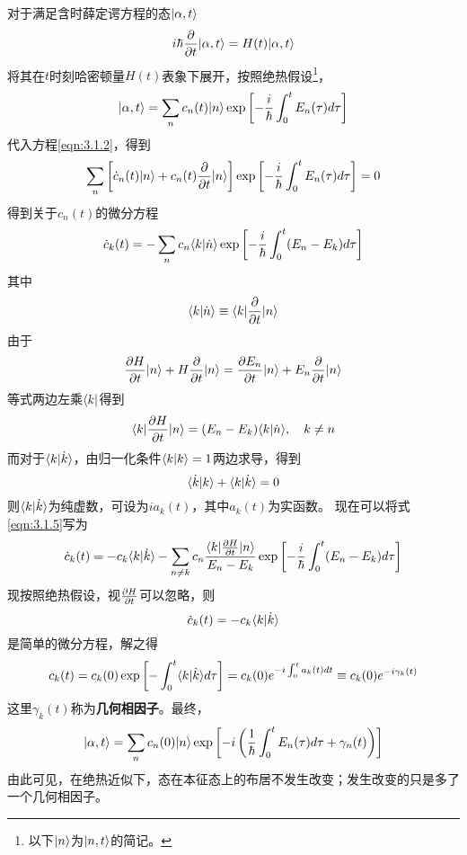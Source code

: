 对于满足含时薛定谔方程的态$ |\alpha,t\rangle $
\begin{equation}\label{eqn:3.1.2}
i\hbar\frac{\partial}{\partial t}|\alpha,t\rangle=H(t)|\alpha,t\rangle
\end{equation}
将其在$ t $时刻哈密顿量$ H(t) $表象下展开，按照绝热假设\footnote{以下$ |n\rangle $为$ |n,t\rangle $的简记。}，
\begin{equation}\label{key}
|\alpha,t\rangle=\sum_nc_n(t)|n\rangle\exp\left[-\frac{i}{\hbar}\int_0^tE_n(\tau)d\tau\right]
\end{equation}
代入方程\eqref{eqn:3.1.2}，得到
\begin{equation}\label{key}
\sum_n\left[\dot{c}_n(t)|n\rangle+c_n(t)\dfrac{\partial}{\partial t}|n\rangle\right]\exp\left[-\frac{i}{\hbar}\int_0^tE_n(\tau)d\tau\right]=0
\end{equation}
得到关于$ c_n(t) $的微分方程
\begin{equation}\label{eqn:3.1.5}
\dot{c}_k(t)=-\sum_nc_n\langle k|\dot{n}\rangle\exp\left[-\dfrac{i}{\hbar}\int_0^t(E_n-E_k)d\tau\right]
\end{equation}
其中
\begin{equation}\label{key}
\langle k|\dot{n}\rangle\equiv\langle k|\frac{\partial}{\partial t}|n\rangle
\end{equation}
由于
\begin{equation}\label{key}
\dfrac{\partial H}{\partial t}|n\rangle+H\dfrac{\partial}{\partial t}|n\rangle=\dfrac{\partial E_n}{\partial t}|n\rangle+E_n\dfrac{\partial}{\partial t}|n\rangle
\end{equation}
等式两边左乘$ \langle k| $得到
\begin{equation}\label{key}
\langle k|\dfrac{\partial H}{\partial t}|n\rangle=(E_n-E_k)\langle k|\dot{n}\rangle,\quad k\neq n
\end{equation}
而对于$ \langle k|\dot{k}\rangle $，由归一化条件$ \langle k|k\rangle=1 $两边求导，得到
\begin{equation}\label{key}
\langle \dot{k}|k\rangle+\langle k|\dot{k}\rangle=0
\end{equation}
则$ \langle k|\dot{k}\rangle $为纯虚数，可设为$ ia_k(t) $，其中$ a_k(t) $为实函数。
现在可以将式\eqref{eqn:3.1.5}写为
\begin{equation}\label{key}
\dot{c}_k(t)=-c_k\langle k|\dot{k}\rangle-\sum_{n\neq k}c_n\dfrac{\langle k|\frac{\partial H}{\partial t}|n\rangle}{E_n-E_k}\exp\left[-\dfrac{i}{\hbar}\int_0^t(E_n-E_k)d\tau\right]
\end{equation}
现按照绝热假设，视$ \frac{\partial H}{\partial t} $可以忽略，则
\begin{equation}\label{key}
\dot{c}_k(t)=-c_k\langle k|\dot{k}\rangle
\end{equation}
是简单的微分方程，解之得
\begin{equation}\label{key}
c_k(t)=c_k(0)\exp\left[-\int_0^t\langle k|\dot{k}\rangle d\tau\right]=c_k(0)e^{-i\int_0^ta_k(t)dt}\equiv c_k(0)e^{-i\gamma_k(t)}
\end{equation}
这里$ \gamma_k(t) $称为\textbf{几何相因子}。最终，
\begin{equation}\label{key}
|\alpha,t\rangle=\sum_nc_n(0)|n\rangle\exp\left[-i\left(\frac{1}{\hbar}\int_0^tE_n(\tau)d\tau+\gamma_n(t)\right)\right]
\end{equation}
由此可见，在绝热近似下，态在本征态上的布居不发生改变；发生改变的只是多了一个几何相因子。

